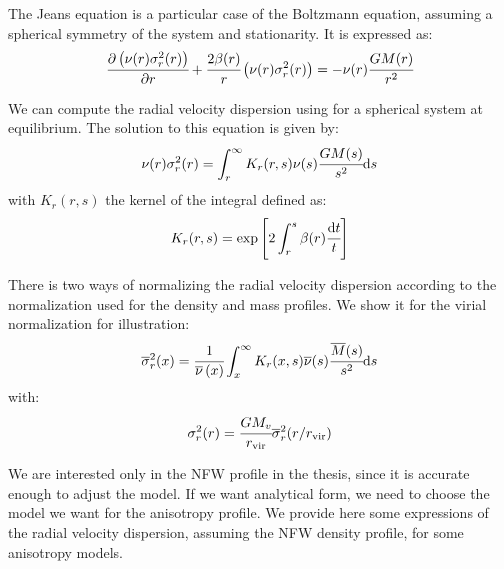The Jeans equation is a particular case of the Boltzmann equation, assuming a
spherical symmetry of the system and stationarity. It is expressed as:
%
\begin{equation}
    \label{eq:jeans}
    \cfrac{{\partial} \left(\nu(r)\sigma_r^2(r)\right)}{{\partial} r} + \cfrac{2\beta(r)}{r}\left(\nu(r)\sigma_r^2(r)\right)=
    -\nu(r)\cfrac{GM(r)}{r^2}
\end{equation}

We can compute the radial velocity dispersion using  for
a spherical system at equilibrium. The solution to this equation is given by:
%
\begin{equation}
    \nu(r)\sigma_r^2(r)=\int_r^\infty K_r(r,s)\nu(s)\cfrac{GM(s)}{s^2}{\rm{d}}{s}
\end{equation}
%
with $K_r(r,s)$ the kernel of the integral defined as:
%
\begin{equation}
    K_r(r,s)=\exp\left[2\int_r^s\beta(r)\cfrac{{\rm{d}}{t}}{t}\right]
\end{equation}

There is two ways of normalizing the radial velocity dispersion according to
the normalization used for the density and mass profiles. We show it for the
virial normalization for illustration:
%
\begin{equation}
    \label{eq:sigma_norm}
    \overline\sigma_r^2(x)= \cfrac{1}{\overline\nu \left(x\right)}
    \int_x^\infty K_r(x,s)\overline\nu(s)\cfrac{\overline{M}(s)}{s^2}{\rm{d}} s
\end{equation}
%
with:
%
\begin{equation}
    \sigma_r^2(r) = \cfrac{GM_v}{r_{\rm vir}}\overline\sigma_r^2(r/r_{\rm vir})
\end{equation}

We are interested only in the NFW profile in the thesis, since it is accurate
enough to adjust the model. If we want analytical form, we need to choose the
model we want for the anisotropy profile. We provide here some expressions of
the radial velocity dispersion, assuming the NFW density profile, for some
anisotropy models.

\subsection{\citet{ML+05}}
\label{sub:ml05}

